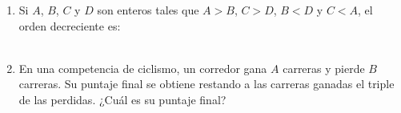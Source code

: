 \documentclass[11pt,letterpaper]{article}
\newenvironment{alternativas}{%
\begin{enumerate}[label=\Alph*), leftmargin=14pt, itemsep=2pt, topsep=2pt]
}{\end{enumerate}}
\begin{document}
\begin{enumerate}[label=\textbf{\arabic*.}, leftmargin=*, itemsep=7pt]
\item
\begin{minipage}[t]{\linewidth}
Si $A$, $B$, $C$ y $D$ son enteros tales que $A>B$, $C>D$, $B<D$ y $C<A$, el orden decreciente es: \\
\\%
\begin{minipage}{\linewidth}
\vspace{7mm}
\end{minipage}
\vspace{7mm}
\end{minipage}

\item
\begin{minipage}[t]{\linewidth}
En una competencia de ciclismo, un corredor gana $A$ carreras y pierde $B$ carreras. Su puntaje final se obtiene restando a las carreras ganadas el triple de las perdidas. ¿Cuál es su puntaje final?\\
\\%
\begin{minipage}{\linewidth}
\vspace{7mm}
\end{minipage}
\vspace{7mm}
\end{minipage}


\end{enumerate}
\end{document}
